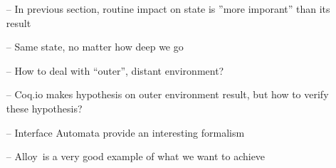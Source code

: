 \begin{itemize}
\item[--] In previous section, routine impact on state is ''more imporant'' than
  its result
\item[--] Same state, no matter how deep we go
\item[--] How to deal with ``outer'', distant environment?
\item[--] Coq.io makes hypothesis on outer environment result, but how to verify
  these hypothesis?
\item[--] Interface Automata provide an interesting formalism
\item[--] Alloy\,\cite{jackson2012alloy} is a very good example of what we want
  to achieve
\end{itemize}

%
%
%
%
